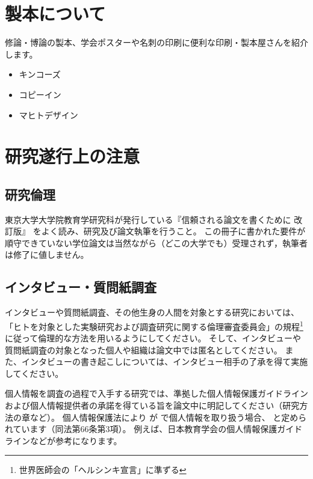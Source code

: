 
\chapter{製本について}
  \label{app:seihon}

  修論・博論の製本、学会ポスターや名刺の印刷に便利な印刷・製本屋さんを紹介します。

  \begin{itemize}
    \item キンコーズ
    \item コピーイン
    \item マヒトデザイン
  \end{itemize}

\chapter{研究遂行上の注意}\label{app:ethic}

  \section{研究倫理}
    \label{sec:echic}

    東京大学大学院教育学研究科が発行している『信頼される論文を書くために 改訂版』
    をよく読み、研究及び論文執筆を行うこと。
    この冊子に書かれた要件が順守できていない学位論文は当然ながら（どこの大学でも）受理されず，執筆者は修了に値しません。

  \section{インタビュー・質問紙調査}
    \label{sec:interview}

    インタビューや質問紙調査、その他生身の人間を対象とする研究においては、「ヒトを対象とした実験研究および調査研究に関する倫理審査委員会」の規程\footnote{世界医師会の「ヘルシンキ宣言」に準ずる}に従って倫理的な方法を用いるようにしてください。
    そして、インタビューや質問紙調査の対象となった個人や組織は論文中では匿名としてください。
    また、インタビューの書き起こしについては、インタビュー相手の了承を得て実施してください。

    個人情報を調査の過程で入手する研究では、準拠した個人情報保護ガイドラインおよび個人情報提供者の承諾を得ている旨を論文中に明記してください（研究方法の章など）。
    個人情報保護法により  が  で個人情報を取り扱う場合、 と定められています（同法第66条第3項）。
    例えば、日本教育学会の個人情報保護ガイドラインなどが参考になります。


